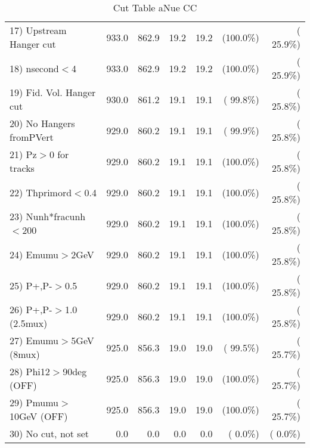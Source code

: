\begin{table}[h!]
\begin{tabular}{||l||r|r|r|r|r|r||}
 17) Upstream Hanger cut  &        933.0 &        862.9 &         19.2 &         19.2 & (100.0\%) & ( 25.9\%) \\
 18) nsecond$<$4          &        933.0 &        862.9 &         19.2 &         19.2 & (100.0\%) & ( 25.9\%) \\
 19) Fid. Vol. Hanger cut &        930.0 &        861.2 &         19.1 &         19.1 & ( 99.8\%) & ( 25.8\%) \\
 20) No Hangers fromPVert &        929.0 &        860.2 &         19.1 &         19.1 & ( 99.9\%) & ( 25.8\%) \\
 21) Pz$>$0 for tracks    &        929.0 &        860.2 &         19.1 &         19.1 & (100.0\%) & ( 25.8\%) \\
 22) Thprimord$<$0.4      &        929.0 &        860.2 &         19.1 &         19.1 & (100.0\%) & ( 25.8\%) \\
 23) Nunh*fracunh$<$200   &        929.0 &        860.2 &         19.1 &         19.1 & (100.0\%) & ( 25.8\%) \\
 24) Emumu$>$2GeV         &        929.0 &        860.2 &         19.1 &         19.1 & (100.0\%) & ( 25.8\%) \\
 25) P+,P-$>$0.5          &        929.0 &        860.2 &         19.1 &         19.1 & (100.0\%) & ( 25.8\%) \\
 26) P+,P-$>$1.0 (2.5mux) &        929.0 &        860.2 &         19.1 &         19.1 & (100.0\%) & ( 25.8\%) \\
 27) Emumu$>$5GeV  (8mux) &        925.0 &        856.3 &         19.0 &         19.0 & ( 99.5\%) & ( 25.7\%) \\
 28) Phi12$>$90deg  (OFF) &        925.0 &        856.3 &         19.0 &         19.0 & (100.0\%) & ( 25.7\%) \\
 29) Pmumu$>$10GeV  (OFF) &        925.0 &        856.3 &         19.0 &         19.0 & (100.0\%) & ( 25.7\%) \\
 30) No cut, not set      &          0.0 &          0.0 &          0.0 &          0.0 & (  0.0\%) & (  0.0\%) \\
 \hline
 \hline
 \end{tabular}
 \caption{Cut Table  aNue CC  }
 \label{tab-cutheavy_neutrino_3.000}
 \end{table}
